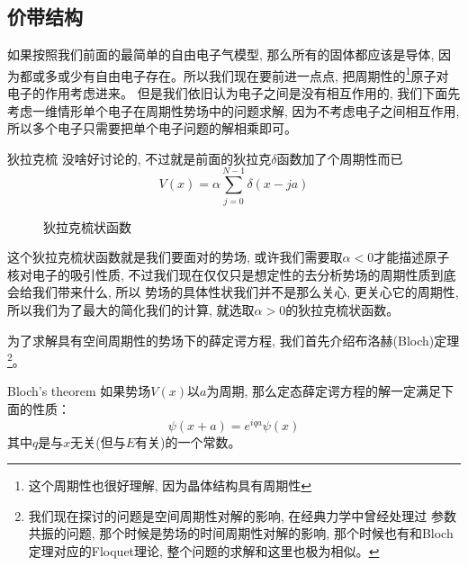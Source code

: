 \subsection{价带结构}
如果按照我们前面的最简单的自由电子气模型, 那么所有的固体都应该是导体, 因为都或多或少有自由电子存在。所以我们现在要前进一点点, 把周期性的\footnote{这个周期性也很好理解, 因为晶体结构具有周期性}原子对电子的作用考虑进来。
但是我们依旧认为电子之间是没有相互作用的, 我们下面先考虑一维情形单个电子在周期性势场中的问题求解, 因为不考虑电子之间相互作用, 所以多个电子只需要把单个电子问题的解相乘即可。
\begin{define}{狄拉克梳}
    没啥好讨论的, 不过就是前面的狄拉克$\delta$函数加了个周期性而已
    \begin{equation}
        V(x)=\alpha \sum_{j=0}^{N-1} \delta(x-j a)
    \end{equation}
\end{define}
\begin{figure}
    \centering
    \caption{狄拉克梳状函数}
    \label{fig:5.4}
\end{figure}
这个狄拉克梳状函数就是我们要面对的势场, 或许我们需要取$\alpha<0$才能描述原子核对电子的吸引性质, 不过我们现在仅仅只是想定性的去分析势场的周期性质到底会给我们带来什么, 所以
势场的具体性状我们并不是那么关心, 更关心它的周期性, 所以我们为了最大的简化我们的计算, 就选取$\alpha>0$的狄拉克梳状函数。

为了求解具有空间周期性的势场下的薛定谔方程, 我们首先介绍布洛赫(Bloch)定理\footnote{我们现在探讨的问题是空间周期性对解的影响, 在经典力学中曾经处理过
参数共振的问题, 那个时候是势场的时间周期性对解的影响, 那个时候也有和Bloch定理对应的Floquet理论, 整个问题的求解和这里也极为相似。}。
\begin{theorem}{Bloch's theorem}
    如果势场$V(x)$以$a$为周期, 那么定态薛定谔方程的解一定满足下面的性质：
    \begin{equation}
        \label{eq:5.34}
        \boxed{
            \psi(x+a)=e^{iqa}\psi(x)
        }
    \end{equation}
    其中$q$是与$x$无关(但与$E$有关)的一个常数。
\end{theorem}

